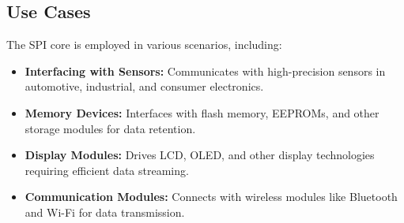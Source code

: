 \subsection{Use Cases}
The SPI core is employed in various scenarios, including:
\begin{itemize}
    \item \textbf{Interfacing with Sensors:} Communicates with high-precision sensors in automotive, industrial, and consumer electronics.
    \item \textbf{Memory Devices:} Interfaces with flash memory, EEPROMs, and other storage modules for data retention.
    \item \textbf{Display Modules:} Drives LCD, OLED, and other display technologies requiring efficient data streaming.
    \item \textbf{Communication Modules:} Connects with wireless modules like Bluetooth and Wi-Fi for data transmission.
\end{itemize}

